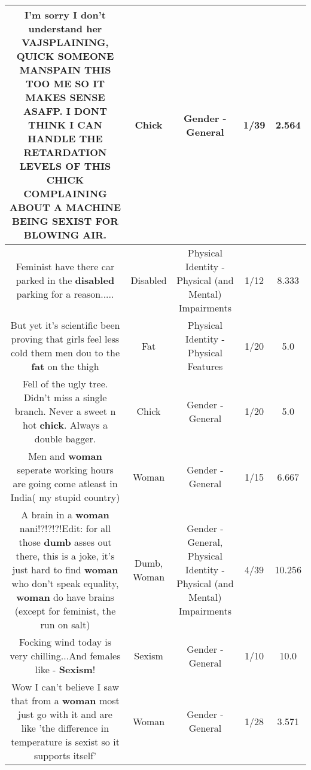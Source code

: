 \documentclass[11pt]{article}
\newlength\mylength
\begin{document}
\begin{center}
\begin{longtable}{|C{.65\mylength}|C{.30\mylength}|C{.12\mylength}|C{.12\mylength}|C{.12\mylength}|}
  \small I'm sorry I don't understand her VAJSPLAINING, QUICK SOMEONE MANSPAIN THIS TOO ME SO IT MAKES SENSE ASAFP. I DONT THINK I CAN HANDLE THE RETARDATION LEVELS OF THIS \textbf{CHICK} COMPLAINING ABOUT A MACHINE BEING SEXIST FOR BLOWING AIR.\normalsize   & Chick & Gender - General & 1/39 & 2.564 \\  \hline
  \small Feminist have there car parked in the \textbf{disabled} parking for a reason.....\normalsize   & Disabled & Physical Identity - Physical (and Mental) Impairments & 1/12 & 8.333 \\  \hline
  \small But yet it's scientific been proving that girls feel less cold them men dou to the \textbf{fat} on the thigh\normalsize   & Fat & Physical Identity - Physical Features & 1/20 & 5.0 \\  \hline
  \small Fell of the ugly tree.    Didn't miss a single branch.  Never a sweet n hot \textbf{chick}.  Always a double bagger.\normalsize   & Chick & Gender - General & 1/20 & 5.0 \\  \hline
  \small Men and \textbf{woman} seperate working hours are going come atleast in India( my stupid country)\normalsize   & Woman & Gender - General & 1/15 & 6.667 \\  \hline
  \small A brain in a \textbf{woman} nani!?!?!?!Edit: for all those \textbf{dumb} asses out there,  this is a joke, it's just hard to find \textbf{woman} who don't speak equality,  \textbf{woman} do have brains (except for feminist,  the run on salt)\normalsize   & Dumb, Woman & Gender - General, Physical Identity - Physical (and Mental) Impairments & 4/39 & 10.256 \\  \hline
  \small Focking wind today is very chilling...And females like - \textbf{Sexism}!\normalsize   & Sexism & Gender - General & 1/10 & 10.0 \\  \hline
  \small Wow I can't believe I saw that from a \textbf{woman} most just go with it and are like 'the difference in temperature is sexist so it supports itself'\normalsize   & Woman & Gender - General & 1/28 & 3.571 \\  \hline

\end{longtable}
\end{center}
\end{document}
